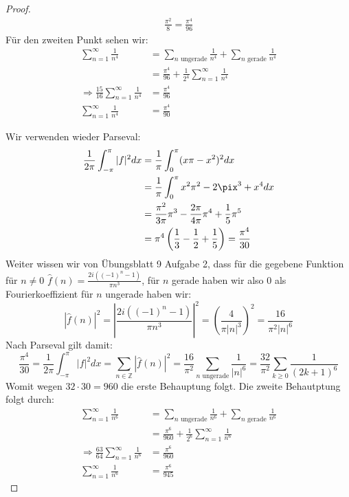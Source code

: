 \documentclass[11pt]{article}
\begin{document}
\begin{proof}
$$\begin{aligned}
              \frac{\pi^2}{8}=\frac{\pi^4}{96}
        \end{aligned}$$
        Für den zweiten Punkt sehen wir:
        $$\begin{aligned}
              \sum_{n=1}^{\infty }\frac{1}{n^4}&= \sum_{n\text{ ungerade}}\frac{1}{n^4} +
              \sum_{n\text{ gerade}}\frac{1}{n^4}\\
              &= \frac{\pi^4}{96}+\frac{1}{2^4}\sum_{n=1}^{\infty}\frac{1}{n^4}\\
              \Rightarrow \frac{15}{16}\sum_{n=1}^{\infty}\frac{1}{n^4} &= \frac{\pi^4}{96}\\
              \sum_{n=1}^{\infty} \frac{1}{n^4}&=\frac{\pi^4}{90}
        \end{aligned}$$

        Wir verwenden wieder Parseval:
        $$\begin{aligned}
              \frac{1}{2\pi}\int_{-\pi}^{\pi} |f|^{2}dx &= \frac{1}{\pi}\int_0^{\pi} (x\pi-x^2)^{2}dx\\
              &= \frac{1}{\pi}\int_0^{\pi} x^2\pi^2-2\pix^3+x^4 dx\\
              &= \frac{\pi^2}{3\pi}\pi^3-\frac{2\pi}{4\pi}\pi^4+\frac{1}{5}\pi^5\\
              &= \pi^4\left(\frac{1}{3}-\frac{1}{2}+\frac{1}{5}\right)=\frac{\pi^4}{30}
        \end{aligned}$$
        Weiter wissen wir von Übungsblatt 9 Aufgabe 2, dass für die gegebene Funktion für $n\neq 0$
        $\hat{f}(n)=\frac{2i((-1)^n -1)}{\pi n^3}$, für $n$ gerade haben wir also $0$ als
        Fourierkoeffizient für $n$ ungerade haben wir:
        $$|\hat{f}(n)|^2=\left|\frac{2i((-1)^n -1)}{\pi n^3}\right|^2=\left(\frac{4}{\pi |n|^3}\right)^2
        =\frac{16}{\pi^2 |n|^6}$$
        Nach Parseval gilt damit:
        $$\frac{\pi^4}{30}=\frac{1}{2\pi}\int_{-\pi}^{\pi}|f|^2dx =\sum_{n \in \mathbb{Z}}|\hat{f}(n)|^2
        =\frac{16}{\pi^2}\sum_{n\text{ ungerade}}\frac{1}{|n|^6}=\frac{32}{\pi^2}
        \sum_{k\geq 0}\frac{1}{(2k+1)^6}$$
        Womit wegen $32\cdot 30=960$ die erste Behauptung folgt. Die zweite Behautptung folgt durch:
        $$\begin{aligned}
              \sum_{n=1}^{\infty}\frac{1}{n^6} &= \sum_{n\text{ ungerade}}\frac{1}{n^6} +
              \sum_{n\text{ gerade}}\frac{1}{n^6}\\
              &= \frac{\pi^6}{960}+\frac{1}{2^6}\sum_{n=1}^{\infty}\frac{1}{n^6}\\
              \Rightarrow \frac{63}{64}\sum_{n=1}^{\infty}\frac{1}{n^6} &= \frac{\pi^6}{960}\\
              \sum_{n=1}^{\infty} \frac{1}{n^6}&=\frac{\pi^6}{945}
        \end{aligned}$$
    \end{proof}
\end{document}
